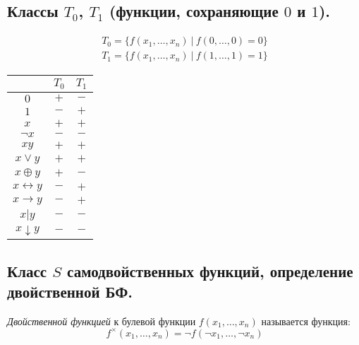 \subsection{Классы $T_0$, $T_1$ (функции, сохраняющие $0$ и $1$).}

\begin{definition}[Классы $T_0, \ T_1$]
    \[
        \begin{array}{l}
            T_0 = \{f(x_1,\ldots,x_n) \ \big| \ f(0,\ldots,0) = 0\} \\
            T_1 = \{f(x_1,\ldots,x_n) \ \big| \ f(1,\ldots,1) = 1\}
        \end{array}
    \]

    \begin{center}
        \begin{tabular}{c | c c}
                                  & $T_0$ & $T_1$ \\ [0.5ex]
            \hline
            $0$                   & $+$   & $-$   \\
            $1$                   & $-$   & $+$   \\
            $x$                   & $+$   & $+$   \\
            $\lnot x$             & $-$   & $-$   \\
            $xy$                  & $+$   & $+$   \\
            $x\lor y$             & $+$   & $+$   \\
            $x \oplus y$          & $+$   & $-$   \\
            $x \leftrightarrow y$ & $-$   & $+$   \\
            $x \rightarrow y$     & $-$   & $+$   \\
            $x \vert y$           & $-$   & $-$   \\
            $x \downarrow y$      & $-$   & $-$   \\
        \end{tabular}
        \label{table:4}
    \end{center}
\end{definition}

\subsection{Класс $S$ самодвойственных функций, определение двойственной БФ.}

\begin{definition}
    \emph{Двойственной функцией} к булевой функции $f(x_1,\ldots,x_n)$ называется функция:
    \[
        f^\times(x_1,\ldots,x_n) = \lnot f(\lnot x_1,\ldots, \lnot x_n)
    \]
\end{definition}

